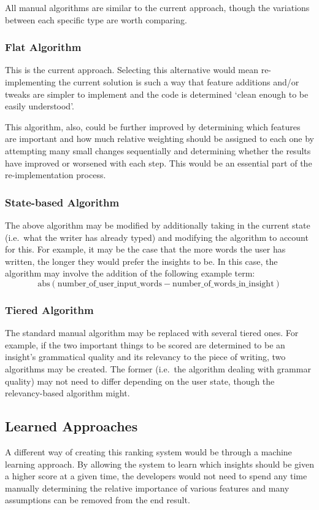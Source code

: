 \documentclass[12pt]{article}
\begin{document}
All manual algorithms are similar to the current approach, though the variations between each specific type are worth comparing.

\subsubsection{Flat Algorithm}
This is the current approach. Selecting this alternative would mean re-implementing the current solution is such a way that feature additions and/or tweaks are simpler to implement and the code is determined `clean enough to be easily understood'.

This algorithm, also, could be further improved by determining which features are important and how much relative weighting should be assigned to each one by attempting many small changes sequentially and determining whether the results have improved or worsened with each step. This would be an essential part of the re-implementation process.

\subsubsection{State-based Algorithm}
The above algorithm may be modified by additionally taking in the current state (i.e.\ what the writer has already typed) and modifying the algorithm to account for this. For example, it may be the case that the more words the user has written, the longer they would prefer the insights to be. In this case, the algorithm may involve the addition of the following example term: \[ \textrm{abs} (\textrm{number\_of\_user\_input\_words} - \textrm{number\_of\_words\_in\_insight}) \]

\subsubsection{Tiered Algorithm}
The standard manual algorithm may be replaced with several tiered ones. For example, if the two important things to be scored are determined to be an insight's grammatical quality and its relevancy to the piece of writing, two algorithms may be created. The former (i.e.\ the algorithm dealing with grammar quality) may not need to differ depending on the user state, though the relevancy-based algorithm might.

\subsection{Learned Approaches}
A different way of creating this ranking system would be through a machine learning approach. By allowing the system to learn which insights should be given a higher score at a given time, the developers would not need to spend any time manually determining the relative importance of various features and many assumptions can be removed from the end result.
\end{document}
